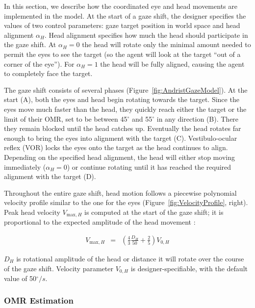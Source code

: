 In this section, we describe how the coordinated eye and head movements are implemented in the model. At the start of a gaze shift, the designer specifies the values of two control parameters: gaze target position in world space and head alignment $\alpha_H$. Head alignment specifies how much the head should participate in the gaze shift. At $\alpha_H = 0$ the head will rotate only the minimal amount needed to permit the eyes to see the target (so the agent will look at the target ``out of a corner of the eye''). For $\alpha_H = 1$ the head will be fully aligned, causing the agent to completely face the target.

The gaze shift consists of several phases (Figure~\ref{fig:AndristGazeModel}). At the start (A), both the eyes and head begin rotating towards the target. Since the eyes move much faster than the head, they quickly reach either the target or the limit of their OMR, set to be between 45$^{\circ}$ and 55$^{\circ}$ in any direction (B). There they remain blocked until the head catches up. Eventually the head rotates far enough to bring the eyes into alignment with the target (C). Vestibulo-ocular reflex (VOR) locks the eyes onto the target as the head continues to align. Depending on the specified head alignment, the head will either stop moving immediately ($\alpha_H = 0$) or continue rotating until it has reached the required alignment with the target (D).

Throughout the entire gaze shift, head motion follows a piecewise polynomial velocity profile similar to the one for the eyes (Figure~\ref{fig:VelocityProfile}, right). Peak head velocity $V_{\mathrm{max},H}$ is computed at the start of the gaze shift; it is proportional to the expected amplitude of the head movement \cite{guitton1987gaze}:

\begin{eqnarray} \label{eq:AndristVmaxH}
V_{\mathrm{max},H} &=& (\frac{4}{3} \frac{D_H}{50} + \frac{2}{5}) V_{0,H}
\end{eqnarray}

$D_H$ is rotational amplitude of the head or distance it will rotate over the course of the gaze shift. Velocity parameter $V_{0,H}$ is designer-specifiable, with the default value of 50$^{\circ}/s$.

\subsubsection{OMR Estimation}

